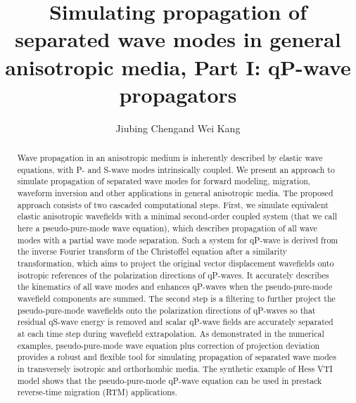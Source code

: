 \title{Simulating propagation of separated wave modes in general anisotropic media, Part I: qP-wave propagators}

\author{
Jiubing Cheng\footnotemark[1] and Wei Kang\footnotemark[2]
}

\address{
\footnotemark[1] State Key Laboratory of Marine Geology, Tongji University, Shanghai, China. E-mail: cjb1206@tongji.edu.cn\\
\footnotemark[2] School of Ocean and Earth Science, Tongji University, Shanghai, China. E-mail: w.kang\_1986@hotmail.com
}


\maketitle

\begin{abstract}
Wave propagation in an anisotropic medium is inherently described by elastic wave equations, with P- and S-wave modes
intrinsically coupled. We present an approach to simulate propagation of separated wave modes for
 forward modeling,
 migration, waveform inversion and other applications in general anisotropic media.
The proposed approach consists of two cascaded computational steps. First, we simulate equivalent
 elastic anisotropic wavefields with a minimal second-order coupled system 
(that we call here a pseudo-pure-mode wave equation),
which describes propagation of all wave modes with a partial wave mode separation. Such a system for qP-wave
 is derived from the inverse Fourier transform of the Christoffel equation after a
 similarity transformation, which aims to project the original vector displacement wavefields onto isotropic
 references of the polarization directions of qP-waves. It accurately describes the kinematics
 of all wave modes and enhances qP-waves when the pseudo-pure-mode wavefield components are summed.
 The second step is a filtering to further project the pseudo-pure-mode wavefields onto the polarization directions
 of qP-waves so that residual qS-wave energy is removed and scalar qP-wave fields are accurately separated
 at each time step during wavefield extrapolation.
As demonstrated in the numerical examples, pseudo-pure-mode wave equation plus
correction of projection deviation provides a robust and flexible
tool for simulating propagation of separated wave modes in
transversely isotropic and orthorhombic media.
The synthetic example of Hess VTI model shows that
the pseudo-pure-mode qP-wave equation can be used in prestack reverse-time migration (RTM) applications.
\end{abstract}

